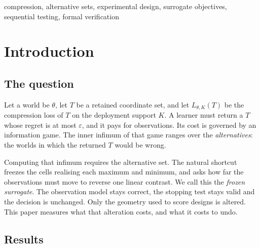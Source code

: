 \begin{abstract}
\emph{Learners.} An ideal learner, defined and proved here, is $\delta$-correct and attains
$\mathbb{E}\tau_{\delta}/\log(1/\delta)\to1/\Gamma_{\rm true}$. The learner that tracks the
surrogate needs $\Omega(\log^{2}(1/\delta))$ samples, both when it tracks the surrogate's optimum
at the true world and when it re-solves the surrogate at its own estimate.

All theorems are machine-checked in Lean~4. Measurements on finite panels are reported as such.
\end{abstract}

\begin{IEEEkeywords}
compression, alternative sets, experimental design, surrogate objectives, sequential testing,
formal verification
\end{IEEEkeywords}

\section{Introduction}
\label{sec:intro}

\subsection{The question}

Let a world be $\theta$, let $T$ be a retained coordinate set, and let $L_{\theta,K}(T)$ be the
compression loss of $T$ on the deployment support $K$. A learner must return a $T$ whose
regret is at most $\varepsilon$, and it pays for observations. Its cost is governed by an
information game. The inner infimum of that game ranges over the \emph{alternatives}: the
worlds in which the returned $T$ would be wrong.

Computing that infimum requires the alternative set. The natural shortcut freezes the cells
realising each maximum and minimum, and asks how far the observations must move to reverse
one linear contrast. We call this the \emph{frozen surrogate}. The observation model stays
correct, the stopping test stays valid and the decision is unchanged. Only the geometry used
to score designs is altered. This paper measures what that alteration costs, and what it
costs to undo.

\subsection{Results}

